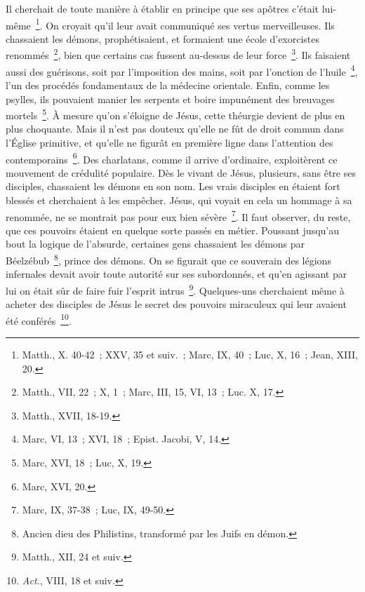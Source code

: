 \documentclass[french,twoside]{book} %
\begin{document}
Il cherchait de toute manière à établir en principe que ses apôtres c’était lui-même \footnote{Matth., X. 40-42 ; XXV, 35 et suiv. ; Marc, IX, 40 ; Luc, X, 16 ; Jean, XIII, 20.}. On croyait qu’il leur avait communiqué ses vertus merveilleuses. Ils chassaient les démons, prophétisaient, et formaient une école d’exorcistes renommés \footnote{Matth., VII, 22 ; X, 1 ; Marc, III, 15, VI, 13 ; Luc. X, 17.}, bien que certains cas fussent au-dessus de leur force \footnote{Matth., XVII, 18-19.}. Ils faisaient aussi des guérisons, soit par l’imposition des mains, soit par l’onction de l’huile \footnote{ Marc, VI, 13 ; XVI, 18 ; Epist. Jacobi, V, 14.}, l’un des procédés fondamentaux de la médecine orientale. Enfin, comme les psylles, ils pouvaient manier les serpents et boire impunément des breuvages mortels \footnote{Marc, XVI, 18 ; Luc, X, 19.}. À mesure qu’on s’éloigne de Jésus, cette théurgie devient de plus en plus choquante. Mais il n’est pas douteux qu’elle ne fût de droit commun dans l’Église primitive, et qu’elle ne figurât en première ligne dans l’attention des contemporains \footnote{Marc, XVI, 20.}. Des charlatans, comme il arrive d’ordinaire, exploitèrent ce mouvement de crédulité populaire. Dès le vivant de Jésus, plusieurs, sans être ses disciples, chassaient les démons en son nom. Les vrais disciples en étaient fort blessés et cherchaient à les empêcher. Jésus, qui voyait en cela un hommage à sa renommée, ne se montrait pas pour eux bien sévère \footnote{Marc, IX, 37-38 ; Luc, IX, 49-50.}. Il faut observer, du reste, que ces pouvoirs étaient en quelque sorte passés en métier. Poussant jusqu’au bout la logique de l’absurde, certaines gens chassaient les démons par Béelzébub \footnote{Ancien dieu des Philistins, transformé par les Juifs en démon.}, prince des démons. On se figurait que ce souverain des légions infernales devait avoir toute autorité sur ses subordonnés, et qu’en agissant par lui on était sûr de faire fuir l’esprit intrus \footnote{Matth., XII, 24 et suiv.}. Quelques-uns cherchaient même à acheter des disciples de Jésus le secret des pouvoirs miraculeux qui leur avaient été conférés \footnote{{\itshape Act.}, VIII, 18 et suiv.}.\par
\end{document}
